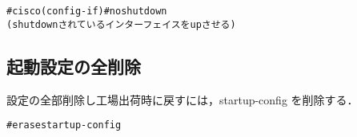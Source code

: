 \begin{center}
\begin{screen}
\begin{alltt}
#cisco(config-if)#no shutdown
   (shutdown されているインターフェイスを up させる)
\end{alltt}
\end{screen}
\end{center}

\subsection*{起動設定の全削除}
設定の全部削除し工場出荷時に戻すには，startup-config を削除する．

\begin{center}
\begin{screen}
\begin{alltt}
#erase startup-config
\end{alltt}
\end{screen}
\end{center}


\clearpage

\clearpage

\clearpage

\clearpage

\clearpage

\clearpage

\clearpage

\clearpage
